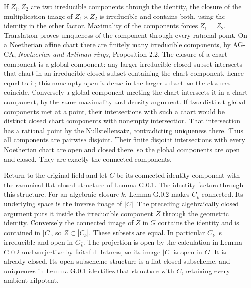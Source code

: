 \documentclass[11pt,a4paper,openany]{report}
\newcounter{none}
\begin{document}
If \(Z_1,Z_2\) are two irreducible components through the identity, the closure of the multiplication image of \(Z_1\times Z_2\) is irreducible and contains both, using the identity in the other factor. Maximality of the components forces \(Z_1=Z_2\). Translation proves uniqueness of the component through every rational point. On a Noetherian affine chart there are finitely many irreducible components, by AG-CA, \emph{Noetherian and Artinian rings}, Proposition 2.2. The closure of a chart component is a global component: any larger irreducible closed subset intersects that chart in an irreducible closed subset containing the chart component, hence equal to it; this nonempty open is dense in the larger subset, so the closures coincide. Conversely a global component meeting the chart intersects it in a chart component, by the same maximality and density argument. If two distinct global components met at a point, their intersections with such a chart would be distinct closed chart components with nonempty intersection. That intersection has a rational point by the Nullstellensatz, contradicting uniqueness there. Thus all components are pairwise disjoint. Their finite disjoint intersections with every Noetherian chart are open and closed there, so the global components are open and closed. They are exactly the connected components.

Return to the original field and let \(C\) be its connected identity component with the canonical flat closed structure of Lemma G.0.1. The identity factors through this structure. For an algebraic closure \(\overline k\), Lemma G.0.2 makes \(C_{\overline k}\) connected. Its underlying space is the inverse image of \(|C|\). The preceding algebraically closed argument puts it inside the irreducible component \(Z\) through the geometric identity. Conversely the connected image of \(Z\) in \(G\) contains the identity and is contained in \(|C|\), so \(Z\subset |C_{\overline k}|\). These subsets are equal. In particular \(C_{\overline k}\) is irreducible and open in \(G_{\overline k}\). The projection is open by the calculation in Lemma G.0.2 and surjective by faithful flatness, so its image \(|C|\) is open in \(G\). It is already closed. Its open subscheme structure is a flat closed subscheme, and uniqueness in Lemma G.0.1 identifies that structure with \(C\), retaining every ambient nilpotent.
\end{document}
